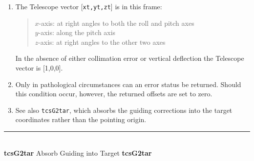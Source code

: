\documentclass[12pt,fleqn,twoside]{article}
\renewcommand{\_}{{\tt\char'137}}     %
\newcommand{\radec}     {$[\,\alpha,\delta\,]$}
\newcommand{\hadec}     {$[\,h,\delta\,]$}
\newcommand{\azel}      {$[\,Az,El~]$}
\newcommand{\routine}[2]
{
  \newpage
  \rule{\textwidth}{0.3mm}\\ \nopagebreak
  {\Large {\bf #1} \hfill #2 \hfill {\bf #1}}
  \vspace{-1ex}
}
\begin{document}
{\begin{enumerate}
\begin{tabbing}
         \> {\tt sst,cst} \> \radec\ $\Rightarrow$ \hadec \\
         \> {\tt spm2   } \> geocentric \hadec\ $\Rightarrow$ {\sc Aim}
      \end{tabbing}
      \begin{tabbing}
         xxx \= xxxxxxxxxx \= \kill
         \> {\tt frame  } \> {\tt APPT\_TOPO} \\
         \> {\tt target } \> topocentric apparent \radec \\
         \> {\tt spm1   } \> identity matrix \\
         \> {\tt sst,cst} \> \radec\ $\Rightarrow$ \hadec \\
         \> {\tt spm2   } \> topocentric \hadec\ $\Rightarrow$ {\sc Aim}
      \end{tabbing}
      \begin{tabbing}
         xxx \= xxxxxxxxxx \= \kill
         \> {\tt frame  } \> {\tt AZEL\_TOPO} \\
         \> {\tt target } \> topocentric \azel\ (N thru E) \\
         \> {\tt spm1   } \> identity matrix \\
         \> {\tt sst,cst} \> not used \\
         \> {\tt spm2   } \> topocentric \azel\ $\Rightarrow$ {\sc Aim}
      \end{tabbing}

      ICRS $\approx$ FK5 J2000 to better than 25 mas.
\item The {\sc Telescope} vector [{\tt xt,yt,zt}] is in this frame:
      \begin{quote}
      $x$-axis:  at right angles to both the roll and pitch axes \\
      $y$-axis:  along the pitch axis \\
      $z$-axis:  at right angles to the other two axes
      \end{quote}
      In the absence of either collimation error or vertical deflection
      the {\sc Telescope} vector is [1,0,0].
\item Only in pathological circumstances can an error status be
      returned.  Should this condition occur, however, the returned
      offsets are set to zero.
\item See also {\tt tcsG2tar}, which absorbs the guiding corrections into
      the target coordinates rather than the pointing origin.
\end{enumerate}
}
\routine{tcsG2tar}{Absorb Guiding into Target}
\label{tcsG2tar}
\end{document}

